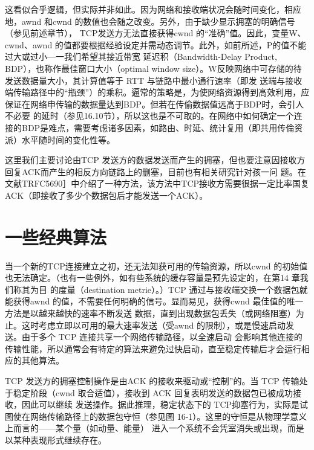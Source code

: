 这看似合乎逻辑，但实际并非如此。因为网络和接收端状况会随时间变化，相应地，awnd 和cwnd 的数值也会随之改变。另外，由于缺少显示拥塞的明确信号（参见前述章节），
TCP发送方无法直接获得cwnd 的“准确”值。因此，变量W、cwnd、awnd 的值都要根据经验设定并需动态调节。此外，如前所述，P的值不能过大或过小—一我们希望其接近带宽
延迟积（Bandwidth-Delay Product, BDP），也称作最佳窗口大小（optimal window size）。W反映网络中可存储的待发送数据量大小，其计算值等于 RTT 与链路中最小通行速率（即发
送端与接收端传输路径中的“瓶颈”）的乘积。逼常的策略是，为使网络资源得到高效利用，应保证在网络申传输的数据量达到BDP。但若在传偷数据值远高于BDP时，会引人不必要
的延时（参见16.10节），所以这也是不可取的。在网络中如何确定一个连接的BDP是难点，需要考虑诸多因素，如路由、时延、统计复用（即共用传倫资派）水平随时间的变化性等。

\begin{tcolorbox}
    这里我们主要讨论由TCP 发送方的数据发送而产生的拥塞，但也要注意因接收方回复ACK而产生的相反方向链路上的删塞，目前也有相关研究针对孩一问
    题。在文献TRFC5690］中介绍了一种方法，该方法中TCP接收方需要很据一定比率国复ACK（即接收了多少个数据包后才能发送一个ACK）。
\end{tcolorbox}

\section{一些经典算法}
当一个新的TCP连接建立之初，还无法知获可用的传输资源，所以cwnd 的初始值也无法确定。（也有一些例外，如有些系统的缓存容量是预先设定的，在第14 章我们称其为目
的度量（destination metrie）。）TCP 通过与接收端交换一个数据包就能获得awnd 的值，不需要任何明确的信号。显而易见，获得cwnd 最佳值的唯一方法是以越来越快的速率不断发送
数据，直到出现数据包丢失（或网络阻塞）为止。这时考虑立即以可用的最大速率发送（受awnd 的限制），或是慢速启动发送。由于多个 TCP 连接共享一个网络传输路径，以全速启动
会影响其他连接的传输性能，所以通常会有特定的算法来避免过快启动，直至稳定传输后才会运行相应的其他算法。

TCP 发送方的拥塞控制操作是由ACK 的接收来驱动或“控制”的。当 TCP 传输处于稳定阶段（cwnd 取合适值），接收到 ACK 回复表明发送的数据包已被成功接收，因此可以继续
发送操作。据此推理，稳定状态下的 TCP抑塞行为，实际是试图使在网络传输路径上的数据包守恒（参见图 16-1）。这里的守恒是从物理学意义上而言的——某个量（如动量、能量）
进入一个系统不会凭室消失或出现，而是以某种表现形式继续存在。

